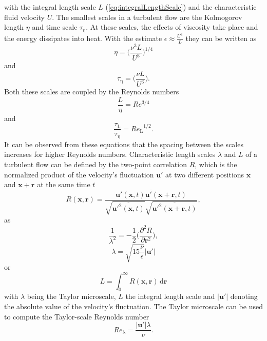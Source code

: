\documentclass[11pt,a4paper,openany,oneside,parskip=half*]{article}
\renewcommand*\vec[1]{\boldsymbol{#1}}
\begin{document}
with the integral length scale $L$ (\ref{eq:integralLengthScale}) and the characteristic fluid velocity $U$.
\newline
The smallest scales in a turbulent flow are the Kolmogorov length $\eta$ and time scale $\tau_\mathrm{\eta}$. At these scales, the effects of viscosity take place and the energy dissipates into heat. With the estimate $\epsilon \approx \frac{U^3}{L} $ they can be written as
\begin{equation}
\eta = \biggl (\frac{\nu^3 L}{U^3} \biggl )^{1/4}
\end{equation}
and
\begin{equation}
\tau_\mathrm{\eta} = \biggl (\frac{\nu L}{U^3} \biggl ).
\end{equation}
Both these scales are coupled by the Reynolds numbers
\begin{equation}
\frac{L}{\eta} = Re^{3/4}
\end{equation}
and
\begin{equation}
\frac{\tau_\mathrm{L}}{\tau_\mathrm{\eta}} = {Re_\mathrm{L}}^{1/2}.
\end{equation}
It can be observed from these equations that the spacing between the scales increases for higher Reynolds numbers. 
\newline
Characteristic length scales $\lambda$ and $L$ of a turbulent flow can be defined by the two-point correlation $R$, which is the normalized product of the velocity's fluctuation $\vec{u'}$ at two different positions 
$\vec{x}$ and $\vec{x} + \vec{r}$ at the same time $t$
\begin{equation}
R (\vec{x}, \vec{r}) = \frac{\overline{\vec{u'}(\vec{x}, t)\vec{u'}(\vec{x} + \vec{r}, t)}}{\sqrt{\overline{\vec{u'}^2(\vec{x}, t)}}\sqrt{\overline{\vec{u'}^2(\vec{x} + \vec{r}, t)}}},
\end{equation}
as
\begin{equation}
 \frac{1}{\lambda^2} = -\frac{1}{2}\biggl(\frac{\partial^2 R}{\partial \vec{r}^2}\biggl),
\end{equation}
\begin{equation}
\lambda = \sqrt{15 \frac{\nu}{\epsilon}} |\vec{u'}|
\end{equation}
or
\begin{equation} \label{eq:integralLengthScale}
L = \int_{0}^{\infty} R (\vec{x}, \vec{r})  \, \mathrm{d}\vec{r}
\end{equation}
with $\lambda$ being the Taylor microscale, $L$ the integral length scale and $|\vec{u'}|$ denoting the absolute value of the velocity's fluctuation.
\newline
The Taylor microscale can be used to compute the Taylor-scale Reynolds number
\begin{equation}
Re_\mathrm{\lambda} = \frac{|\vec{u'}| \lambda}{\nu}.
\end{equation}
\newline
\end{document}
